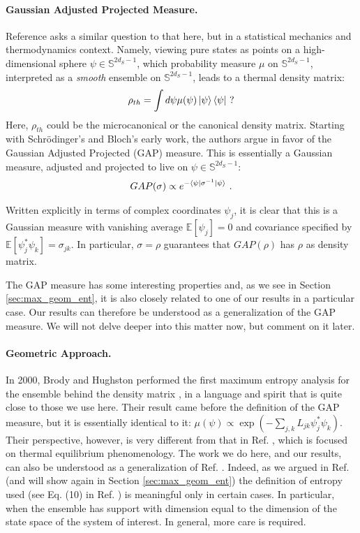 \documentclass[draft,nofootinbib,pre,twocolumn,showpacs,showkeys,groupaddress,preprintnumbers,floatfix]{revtex4-1}
\newcommand{\1}{\mathbbm{1}}
\begin{document}
\paragraph*{Gaussian Adjusted Projected Measure.} Reference \cite{Gold06} asks
a similar question to that here, but in a statistical mechanics and
thermodynamics context. Namely, viewing pure states as points on a
high-dimensional sphere $\psi \in \mathbb{S}^{2d_S-1}$, which probability
measure $\mu$ on $\mathbb{S}^{2d_S-1}$, interpreted as a \emph{smooth}
ensemble on $\mathbb{S}^{2d_S-1}$, leads to a thermal density matrix:
\begin{align*}
\rho_{th} = \int d\psi  \mu(\psi) \ket{\psi}\bra{\psi}~?
\end{align*}
Here, $\rho_{th}$ could be the microcanonical or the canonical density matrix.
Starting with Schr\"odinger's \cite{Schro27,Schrodinger1989} and Bloch's
\cite{Wal89} early work, the authors argue in favor of the Gaussian Adjusted
Projected (GAP) measure. This is essentially a Gaussian measure, adjusted and
projected to live on $\psi \in \mathbb{S}^{2d_S-1}$: 
\begin{align*}
GAP(\sigma) \propto e^{- \bra{\psi} \sigma^{-1} \ket{\psi}}
  ~.
\end{align*}

Written explicitly in terms of complex coordinates $\psi_j$, it is clear that this is a Gaussian measure with vanishing average $\mathbb{E}[\psi_j] = 0$ and 
covariance specified by $\mathbb{E}[\psi_j^{*} \psi_k] = \sigma_{jk}$. In
particular, $\sigma = \rho$ guarantees that $GAP(\rho)$ has $\rho$ as density
matrix. 

The GAP measure has some interesting properties \cite{Gold06,Gold16,Reim08} and, 
as we see in Section \ref{sec:max_geom_ent}, it is also closely related to one of our 
results in a particular case. Our results can therefore be understood as a generalization 
of the GAP measure. We will not delve deeper into this matter now, but comment on it later.

\paragraph*{Geometric Approach.} In 2000, Brody and Hughston performed the
first maximum entropy analysis for the ensemble behind the density matrix
\cite{Brody2000}, in a language and spirit that is quite close to those we use
here. Their result came before the definition of the GAP measure, but it is
essentially identical to it: $\mu(\psi) \propto \exp(-\sum_{j,k}
L_{jk}\psi_j^{*}\psi_k)$. Their perspective, however, is very different from
that in Ref. \cite{Gold06}, which is focused on thermal equilibrium
phenomenology. The work we do here, and our results, can also be understood as
a generalization of Ref. \cite{Brody2000}. Indeed, as we argued in Ref.
\cite{Anza22a} (and will show again in Section \ref{sec:max_geom_ent}) the
definition of entropy used (see Eq. (10) in Ref. \cite{Brody2000}) is
meaningful only in certain cases. In particular, when the ensemble has support
with dimension equal to the dimension of the state space of the system of
interest. In general, more care is required. 
\end{document}

